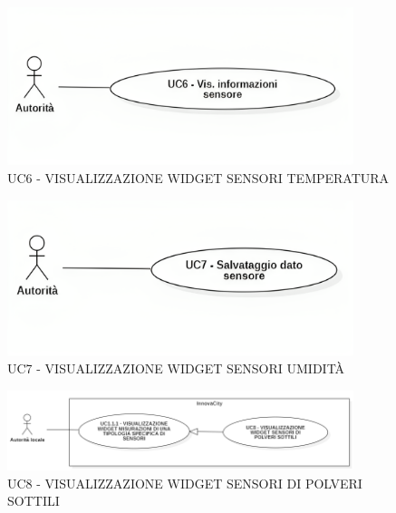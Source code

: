 


\begin{figure}[H]
    \centering
    \includegraphics[width=0.9\textwidth]{../Images/uc6.png}
    \caption{UC6 - VISUALIZZAZIONE WIDGET SENSORI TEMPERATURA }
    \label{fig:UC6}
\end{figure}




\begin{figure}[H]
    \centering
    \includegraphics[width=0.9\textwidth]{../Images/uc7.png}
    \caption{UC7 - VISUALIZZAZIONE WIDGET SENSORI UMIDITÀ }
\end{figure}




\begin{figure}[H]
    \centering
    \includegraphics[width=0.9\textwidth]{../Images/uc8.PNG}
    \caption{UC8 - VISUALIZZAZIONE WIDGET SENSORI DI POLVERI SOTTILI }
\end{figure}

